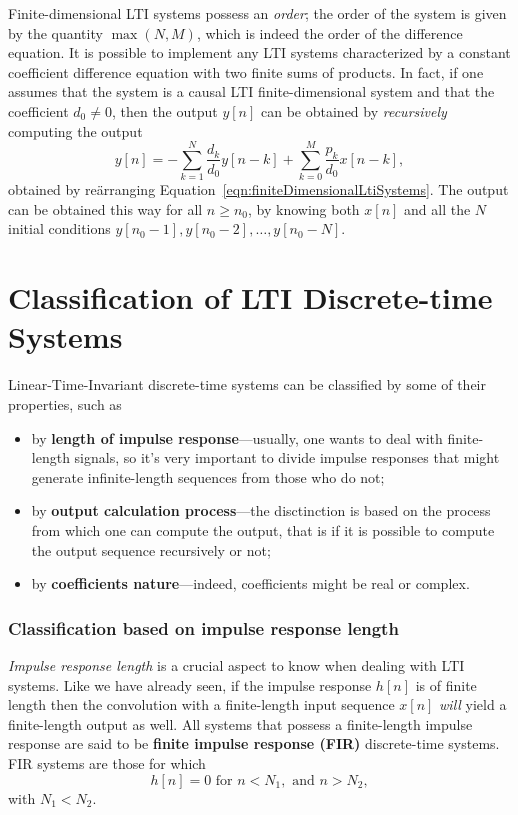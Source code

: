 \documentclass[\documentfontsize, twocolumn]{\classname}
\begin{document}
Finite-dimensional LTI systems possess an \emph{order}; the order of the system is given by the quantity $\max {(N,M)}$, which is indeed the order of the difference equation. It is possible to implement any LTI systems characterized by a constant coefficient difference equation with two finite sums of products. In fact, if one assumes that the system is a causal LTI finite-dimensional system and that the coefficient $d_0 \neq 0$, then the output $y[n]$ can be obtained by \emph{recursively} computing the output
\begin{equation}\label{eqn:finiteDimensionalLtiSystemsRecursive}
    y[n]= -\sum_{k=1}^N \frac {d_k}{d_0} y[n-k] + \sum_{k=0}^M \frac{p_k}{d_0} x[n-k],
\end{equation}
obtained by re\"arranging Equation~\ref{eqn:finiteDimensionalLtiSystems}. The output can be obtained this way for all $n \geq n_0$, by knowing both $x[n]$ and all the $N$ initial conditions $y[n_0-1], y[n_0-2],\dots,y[n_0-N]$.

\section{Classification of LTI Discrete-time Systems}

Linear-Time-Invariant discrete-time systems can be classified by some of their properties, such as
\begin{itemize}
    \item by \textbf{length of impulse response}---usually, one wants to deal with finite-length signals, so it's very important to divide impulse responses that might generate infinite-length sequences from those who do not;
    \item by \textbf{output calculation process}---the disctinction is based on the process from which one can compute the output, that is if it is possible to compute the output sequence recursively or not;
    \item by \textbf{coefficients nature}---indeed, coefficients might be real or complex.
\end{itemize}

\subsubsection{Classification based on impulse response length}
\emph{Impulse response length} is a crucial aspect to know when dealing with LTI systems. Like we have already seen, if the impulse response $h[n]$ is of finite length then the convolution with a finite-length input sequence $x[n]$ \emph{will} yield a finite-length output as well. All systems that possess a finite-length impulse response are said to be \textbf{finite impulse response (FIR)} discrete-time systems. FIR systems are those for which
\begin{equation}\label{eqn:finiteImpulseResponse}
    h[n] = 0 \mbox{ for } n < N_1, \mbox{ and } n > N_2,
\end{equation}
with $N_1 < N_2$.
\end{document}
